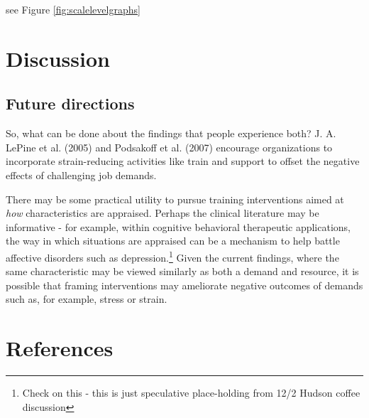 \documentclass[
  english,
  man]{apa6}
\begin{document}
see Figure \ref{fig:scalelevelgraphs}

\newpage

\hypertarget{discussion}{%
\section{Discussion}\label{discussion}}

\hypertarget{future-directions}{%
\subsection{Future directions}\label{future-directions}}

So, what can be done about the findings that people experience both? J. A. LePine et al. (2005) and Podsakoff et al. (2007) encourage organizations to incorporate strain-reducing activities like train and support to offset the negative effects of challenging job demands.

There may be some practical utility to pursue training interventions aimed at \emph{how} characteristics are appraised. Perhaps the clinical literature may be informative - for example, within cognitive behavioral therapeutic applications, the way in which situations are appraised can be a mechanism to help battle affective disorders such as depression.\footnote{Check on this - this is just speculative place-holding from 12/2 Hudson coffee discussion} Given the current findings, where the same characteristic may be viewed similarly as both a demand and resource, it is possible that framing interventions may ameliorate negative outcomes of demands such as, for example, stress or strain.

\newpage

\hypertarget{references}{%
\section{References}\label{references}}

\begingroup
\setlength{\parindent}{-0.5in}
\setlength{\leftskip}{0.5in}
\end{document}
